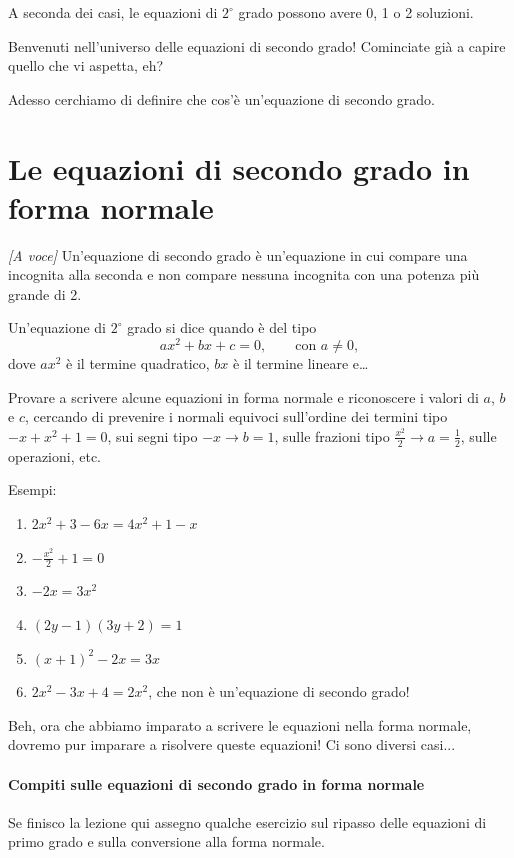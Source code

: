 \documentclass[11pt]{report}
\begin{document}
\begin{mdframed}
    A seconda dei casi, le equazioni di $2^\circ$ grado possono avere 0, 1 o 2 soluzioni.
\end{mdframed}

Benvenuti nell'universo delle equazioni di secondo grado! Cominciate già a capire quello che vi aspetta, eh?

Adesso cerchiamo di definire che cos'è un'equazione di secondo grado.

\section{Le equazioni di secondo grado in forma normale}

\textit{[A voce]} Un'equazione di secondo grado è un'equazione in cui compare una incognita alla seconda e non compare nessuna incognita con una potenza più grande di 2.

\begin{mdframed}
    Un'equazione di $2^\circ$ grado si dice  quando è del tipo
    $$
    ax^2+bx+c = 0, \qquad \text{con }a \ne 0,
    $$
    dove $ax^2$ è il termine quadratico, $bx$ è il termine lineare e\dots
\end{mdframed}

Provare a scrivere alcune equazioni in forma normale e riconoscere i valori di $a$, $b$ e $c$, cercando di prevenire i normali equivoci sull'ordine dei termini tipo $-x+x^2+1=0$, sui segni tipo $-x \rightarrow b=1$, sulle frazioni  tipo $\frac{x^2}2 \rightarrow a=\frac 12$, sulle operazioni, etc.

Esempi:
\begin{enumerate}
    \item $2x^2+3-6x=4x^2+1-x$
    \item $-\frac{x^2}2+1=0$
    \item $-2x=3x^2$
    \item $(2y-1)(3y+2)=1$
    \item $(x+1)^2-2x=3x$
    \item $2x^2-3x+4=2x^2$, che non è un'equazione di secondo grado!
\end{enumerate}

Beh, ora che abbiamo imparato a scrivere le equazioni nella forma normale, dovremo pur imparare a risolvere queste equazioni! Ci sono diversi casi...

\paragraph{Compiti sulle equazioni di secondo grado in forma normale}
Se finisco la lezione qui assegno qualche esercizio sul ripasso delle equazioni di primo grado e sulla conversione alla forma normale.
\end{document}
